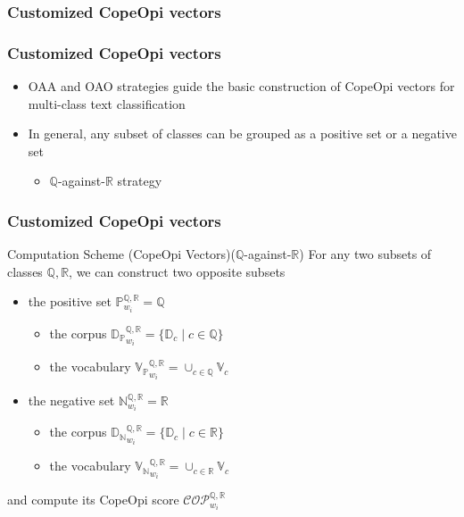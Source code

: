 \documentclass[mathserif]{beamer}
\DeclareMathOperator*{\where}{|}
\begin{document}
\subsubsection{Customized CopeOpi vectors}
\begin{frame}
\frametitle{Customized CopeOpi vectors}
\begin{itemize}
\item OAA and OAO strategies guide the basic construction of CopeOpi vectors for multi-class text classification
\item In general, any subset of classes can be grouped as a positive set or a negative set
	\begin{itemize}
	\item $\mathbb{Q}$-against-$\mathbb{R}$ strategy
	\end{itemize}
\end{itemize}
\end{frame}

\begin{frame}
\frametitle{Customized CopeOpi vectors}
\begin{block}{Computation Scheme (CopeOpi Vectors)($\mathbb{Q}$-against-$\mathbb{R}$)}
For any two subsets of classes $\mathbb{Q},\mathbb{R}$, we can construct two opposite subsets
\begin{itemize}
\item the positive set $\mathbb{P}^{\mathbb{Q},\mathbb{R}}_{w_i} = \mathbb{Q}$
	\begin{itemize}
	\item the corpus ${\mathbb{D}_\mathbb{P}}^{\mathbb{Q},\mathbb{R}}_{w_i} = \{\mathbb{D}_{c} \where c \in \mathbb{Q}\}$
	\item the vocabulary ${\mathbb{V}_\mathbb{P}}^{\mathbb{Q},\mathbb{R}}_{w_i} = \cup_{c \in \mathbb{Q}} \mathbb{V}_{c}$
	\end{itemize}
\item the negative set $\mathbb{N}^{\mathbb{Q},\mathbb{R}}_{w_i} = \mathbb{R}$
	\begin{itemize}
	\item the corpus ${\mathbb{D}_\mathbb{N}}^{\mathbb{Q},\mathbb{R}}_{w_i} = \{\mathbb{D}_{c} \where c \in \mathbb{R}\}$
	\item the vocabulary ${\mathbb{V}_\mathbb{N}}^{\mathbb{Q},\mathbb{R}}_{w_i} = \cup_{c \in \mathbb{R}} \mathbb{V}_{c}$
	\end{itemize}
\end{itemize}
and compute its CopeOpi score $\mathcal{COP}^{\mathbb{Q},\mathbb{R}}_{w_i}$
\end{block}
\end{frame}
\end{document}
